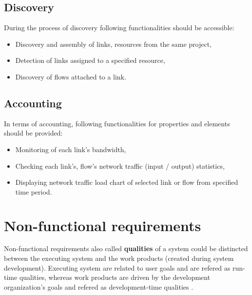 \documentclass[11pt]{book}
\begin{document}
      \subsection{Discovery}
		\label{sec:req:func:disc}
		
		During the process of discovery following functionalities should be accessible:
		
		\begin{itemize}
			\item{Discovery and assembly of links, resources from the same project, }
			\item{Detection of links assigned to a specified resource, }
			\item{Discovery of flows attached to a link. }
		\end{itemize}


      \subsection{Accounting}  %
		\label{sec:req:func:acc}
		
		In terms of accounting, following functionalities for properties and elements should be provided:
		
		\begin{itemize}
			\item{Monitoring of each link's bandwidth, }
			\item{Checking each link's, flow's network traffic (input / output) statistics, }
			\item{Displaying network traffic load chart of selected link or flow from specified time period. }
		\end{itemize}

    \section{Non-functional requirements}
		\label{sec:req:nonfunc}

	
		Non-functional requirements also called \textbf{qualities} of a system could be distincted between 
		the executing system and the work products (created during system development). Executing system are related
		to user goals and are refered as run-time qualities, whereas work products are driven by the development organization’s
		goals and refered as development-time qualities \cite{nonfunctional}. 
\end{document}

